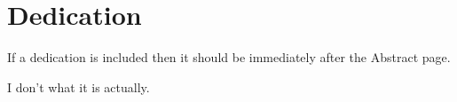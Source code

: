\chapter*{Dedication}
If a dedication is included then it should be immediately after the Abstract page.\par
I don't what it is actually.
\clearpage